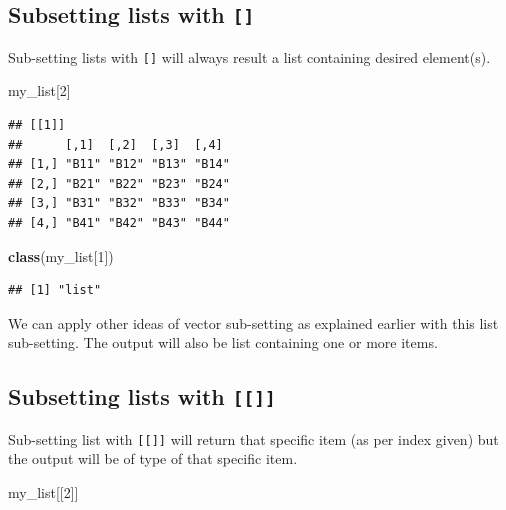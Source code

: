 \documentclass[
]{book}
\newenvironment{Shaded}{\begin{snugshade}}{\end{snugshade}}
\newcommand{\DecValTok}[1]{\textcolor[rgb]{0.00,0.00,0.81}{#1}}
\newcommand{\FunctionTok}[1]{\textcolor[rgb]{0.13,0.29,0.53}{\textbf{#1}}}
\newcommand{\NormalTok}[1]{#1}
\begin{document}
\hypertarget{subsetting-lists-with}{%
\subsection{\texorpdfstring{Subsetting lists with \texttt{{[}{]}}}{Subsetting lists with {[}{]}}}\label{subsetting-lists-with}}

Sub-setting lists with \texttt{{[}{]}} will always result a list containing desired element(s).

\begin{Shaded}
\begin{Highlighting}[]
\NormalTok{my\_list[}\DecValTok{2}\NormalTok{]}
\end{Highlighting}
\end{Shaded}

\begin{verbatim}
## [[1]]
##      [,1]  [,2]  [,3]  [,4] 
## [1,] "B11" "B12" "B13" "B14"
## [2,] "B21" "B22" "B23" "B24"
## [3,] "B31" "B32" "B33" "B34"
## [4,] "B41" "B42" "B43" "B44"
\end{verbatim}

\begin{Shaded}
\begin{Highlighting}[]
\FunctionTok{class}\NormalTok{(my\_list[}\DecValTok{1}\NormalTok{])}
\end{Highlighting}
\end{Shaded}

\begin{verbatim}
## [1] "list"
\end{verbatim}

We can apply other ideas of vector sub-setting as explained earlier with this list sub-setting. The output will also be list containing one or more items.

\hypertarget{subsetting-lists-with-1}{%
\subsection{\texorpdfstring{Subsetting lists with \texttt{{[}{[}{]}{]}}}{Subsetting lists with {[}{[}{]}{]}}}\label{subsetting-lists-with-1}}

Sub-setting list with \texttt{{[}{[}{]}{]}} will return that specific item (as per index given) but the output will be of type of that specific item.

\begin{Shaded}
\begin{Highlighting}[]
\NormalTok{my\_list[[}\DecValTok{2}\NormalTok{]]}
\end{Highlighting}
\end{Shaded}
\end{document}

